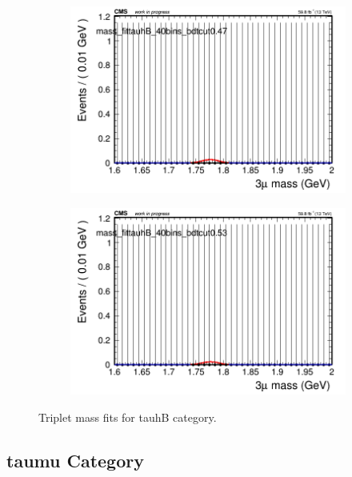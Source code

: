 \begin{figure}[H]
\begin{subfigure}{0.2\textwidth}
        \includegraphics[width=\textwidth]{unfixed_exp/plots/tauhB/massfit_tauhB_40bins_bdtcut0.47.png}
        \caption{}
    \end{subfigure}
    \begin{subfigure}{0.2\textwidth}
        \includegraphics[width=\textwidth]{unfixed_exp/plots/tauhB/massfit_tauhB_40bins_bdtcut0.53.png}
        \caption{}
    \end{subfigure}
    \caption{Triplet mass fits for tauhB category.}
    \label{fig:unfixedexptauhB}
\end{figure}

\subsection{taumu Category}
\label{sec:unfixedexptaumu}

